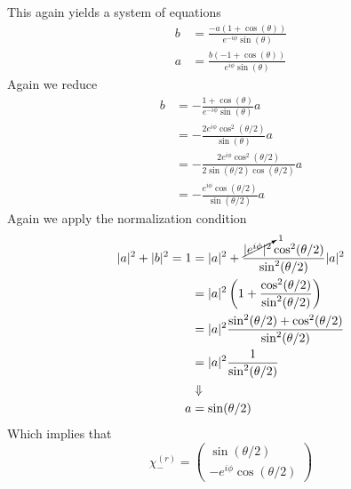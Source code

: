 \documentclass[11pt]{article}
\numberwithin{equation}{section}
\begin{document}
This again yields a system of equations
\begin{align}
b &= \frac{-a(1+\cos(\theta))}{e^{-i\phi}\sin(\theta)}\label{eq:3}\\
a &= \frac{b(-1+\cos(\theta))}{e^{i\phi}\sin(\theta)}\label{eq:4}
\end{align}
Again we reduce
\begin{align*}
b &= -\frac{1+\cos(\theta)}{e^{-i\phi}\sin(\theta)}a\\
&= -\frac{2e^{i\phi}\cos^2(\theta/2)}{\sin(\theta)}a\\
&= -\frac{2e^{i\phi}\cos^2(\theta/2)}{2\sin(\theta/2)\cos(\theta/2)}a\\
&= -\frac{e^{i\phi}\cos(\theta/2)}{\sin(\theta/2)}a
\end{align*}
Again we apply the normalization condition
\begin{align*}
|a|^2 + |b|^2 = 1 &= |a|^2 + \frac{\cancelto{1}{|e^{i\phi}|^2}\cos^2(\theta/2)}{\sin^2(\theta/2)}|a|^2\\
&= |a|^2\left(1 + \frac{\cos^2(\theta/2)}{\sin^2(\theta/2)}\right)\\
&= |a|^2\frac{\sin^2(\theta/2)+\cos^2(\theta/2)}{\sin^2(\theta/2)}\\
&= |a|^2\frac{1}{\sin^2(\theta/2)}\\
&\Downarrow\\
a &= \sin(\theta/2)
\end{align*}
Which implies that
$$\chi^{(r)}_- = \left(\begin{array}{c}
                 \sin(\theta/2)\\
                 -e^{i\phi}\cos(\theta/2)
\end{array}\right)$$
\end{document}

